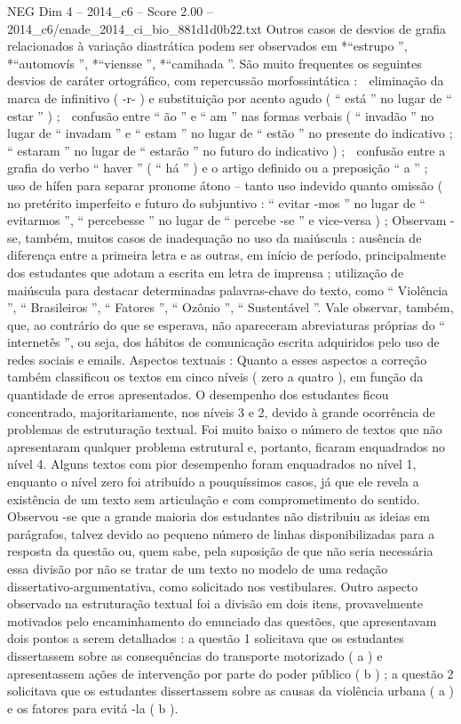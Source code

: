 \begin{textsample}{NEG Dim 4 – 2014\_c6 – Score 2.00 – 2014\_c6/enade\_2014\_ci\_bio\_881d1d0b22.txt}
Outros casos de desvios de grafia relacionados à variação diastrática podem ser observados em *“estrupo ”, *“automovís ”, *“viensse ”, *“camihada ”.
São muito frequentes os seguintes desvios de caráter ortográfico, com repercussão morfossintática :  eliminação da marca de infinitivo ( -r- ) e substituição por acento agudo ( “ está ” no lugar de “ estar ” ) ;  confusão entre “ ão ” e “ am ” nas formas verbais ( “ invadão ” no lugar de “ invadam ” e “ estam ” no lugar de “ estão ” no presente do indicativo ; “ estaram ” no lugar de “ estarão ” no futuro do indicativo ) ;  confusão entre a grafia do verbo “ haver ” ( “ há ” ) e o artigo definido ou a preposição “ a ” ;  uso de hífen para separar pronome átono – tanto uso indevido quanto omissão ( no pretérito imperfeito e futuro do subjuntivo : “ evitar -mos ” no lugar de “ evitarmos ”, “ percebesse ” no lugar de “ percebe -se ” e vice-versa ) ; Observam -se, também, muitos casos de inadequação no uso da maiúscula : ausência de diferença entre a primeira letra e as outras, em início de período, principalmente dos estudantes que adotam a escrita em letra de imprensa ; utilização de maiúscula para destacar determinadas palavras-chave do texto, como “ Violência ”, “ Brasileiros ”, “ Fatores ”, “ Ozônio ”, “ Sustentável ”.
Vale observar, também, que, ao contrário do que se esperava, não apareceram abreviaturas próprias do “ internetês ”, ou seja, dos hábitos de comunicação escrita adquiridos pelo uso de redes sociais e emails.
Aspectos textuais : Quanto a esses aspectos a correção também classificou os textos em cinco níveis ( zero a quatro ), em função da quantidade de erros apresentados.
O desempenho dos estudantes ficou concentrado, majoritariamente, nos níveis 3 e 2, devido à grande ocorrência de problemas de estruturação textual.
Foi muito baixo o número de textos que não apresentaram qualquer problema estrutural e, portanto, ficaram enquadrados no nível 4.
Alguns textos com pior desempenho foram enquadrados no nível 1, enquanto o nível zero foi atribuído a pouquíssimos casos, já que ele revela a existência de um texto sem articulação e com comprometimento do sentido.
Observou -se que a grande maioria dos estudantes não distribuiu as ideias em parágrafos, talvez devido ao pequeno número de linhas disponibilizadas para a resposta da questão ou, quem sabe, pela suposição de que não seria necessária essa divisão por não se tratar de um texto no modelo de uma redação dissertativo-argumentativa, como solicitado nos vestibulares.
Outro aspecto observado na estruturação textual foi a divisão em dois itens, provavelmente motivados pelo encaminhamento do enunciado das questões, que apresentavam dois pontos a serem detalhados : a questão 1 solicitava que os estudantes dissertassem sobre as consequências do transporte motorizado ( a ) e apresentassem ações de intervenção por parte do poder público ( b ) ; a questão 2 solicitava que os estudantes dissertassem sobre as causas da violência urbana ( a ) e os fatores para evitá -la ( b ).

\end{textsample}
